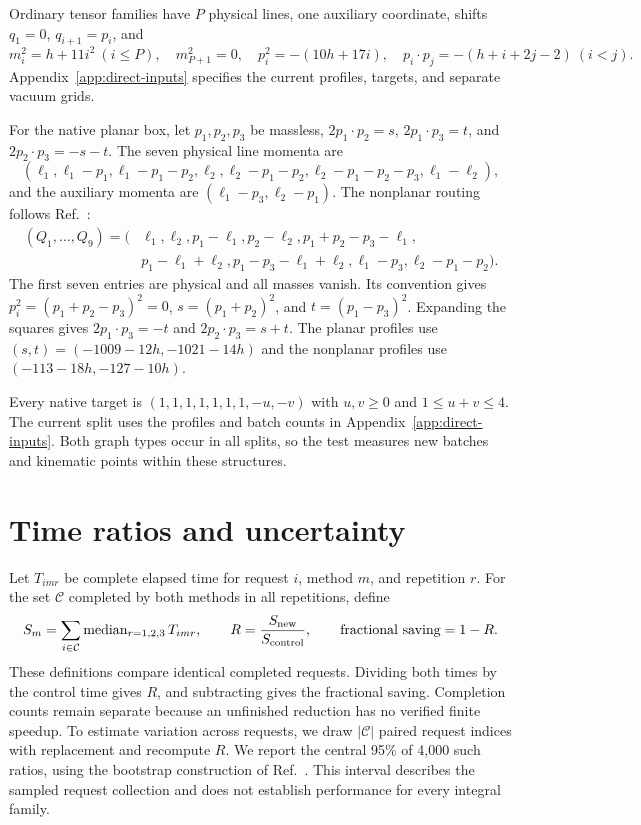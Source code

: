 Ordinary tensor families have $P$ physical lines, one auxiliary coordinate, shifts $q_1=0$, $q_{i+1}=p_i$, and
\begin{equation}
 m_i^2=h+11i^2\ (i\leq P),\quad m_{P+1}^2=0,\quad
 p_i^2=-(10h+17i),\quad p_i\cdot p_j=-(h+i+2j-2)\ (i<j).
 \label{eq:ordinary-input}
\end{equation}
Appendix~\ref{app:direct-inputs} specifies the current profiles, targets, and separate vacuum grids.

For the native planar box, let $p_1,p_2,p_3$ be massless, $2p_1\cdot p_2=s$, $2p_1\cdot p_3=t$, and $2p_2\cdot p_3=-s-t$. The seven physical line momenta are
\begin{equation}
 (\ell_1,\ell_1-p_1,\ell_1-p_1-p_2,\ell_2,
 \ell_2-p_1-p_2,\ell_2-p_1-p_2-p_3,\ell_1-\ell_2),
 \label{eq:planar-input}
\end{equation}
and the auxiliary momenta are $(\ell_1-p_3,\ell_2-p_1)$. The nonplanar routing follows Ref.~\cite{KiraOriginal}:
\begin{align}
 (Q_1,\ldots,Q_9)=(&\ell_1,\ell_2,p_1-\ell_1,p_2-\ell_2,
 p_1+p_2-p_3-\ell_1,\nonumber\\
 &p_1-\ell_1+\ell_2,p_1-p_3-\ell_1+\ell_2,
 \ell_1-p_3,\ell_2-p_1-p_2).
 \label{eq:nonplanar-input}
\end{align}
The first seven entries are physical and all masses vanish. Its convention gives $p_i^2=(p_1+p_2-p_3)^2=0$, $s=(p_1+p_2)^2$, and $t=(p_1-p_3)^2$. Expanding the squares gives $2p_1\cdot p_3=-t$ and $2p_2\cdot p_3=s+t$. The planar profiles use $(s,t)=(-1009-12h,-1021-14h)$ and the nonplanar profiles use $(-113-18h,-127-10h)$.

Every native target is $(1,1,1,1,1,1,1,-u,-v)$ with $u,v\geq0$ and $1\leq u+v\leq4$. The current split uses the profiles and batch counts in Appendix~\ref{app:direct-inputs}. Both graph types occur in all splits, so the test measures new batches and kinematic points within these structures.

\section{Time ratios and uncertainty}
\label{app:statistics}
Let $T_{imr}$ be complete elapsed time for request $i$, method $m$, and repetition $r$. For the set $\mathcal C$ completed by both methods in all repetitions, define
\begin{equation}
 S_m=\sum_{i\in\mathcal C}\operatorname{median}_{r=1,2,3}T_{imr},\qquad
 R=\frac{S_{\rm new}}{S_{\rm control}},\qquad
 \text{fractional saving}=1-R.
 \label{eq:time-ratio}
\end{equation}
These definitions compare identical completed requests. Dividing both times by the control time gives $R$, and subtracting gives the fractional saving. Completion counts remain separate because an unfinished reduction has no verified finite speedup. To estimate variation across requests, we draw $|\mathcal C|$ paired request indices with replacement and recompute $R$. We report the central 95\% of 4,000 such ratios, using the bootstrap construction of Ref.~\cite{Efron1979}. This interval describes the sampled request collection and does not establish performance for every integral family.
